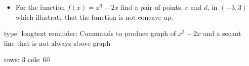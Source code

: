 \documentclass[12pt]{article}
\begin{document}
\begin{itemize}
\itemsep1pt\parskip0pt
\item
  For the function $f(x) = x^3 - 2x$ find a pair of points, $c$ and $d$,
  in $(-3,3)$ which illustrate that the function is not concave up.
\end{itemize}

\begin{answer}
type: longtext
reminder: Commands to produce graph of \( x^3 - 2x \) and a secant line that is not always above graph

rows: 3
cols: 60
\end{answer}
\end{document}
